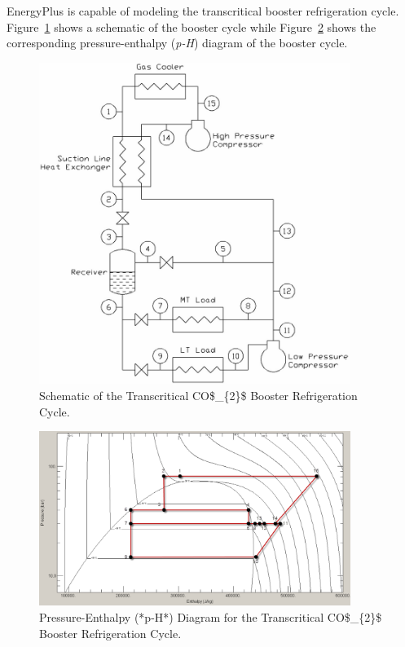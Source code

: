 EnergyPlus is capable of modeling the transcritical booster refrigeration cycle. Figure~\ref{fig:schematic-of-the-transcritical-co_2-booster} shows a schematic of the booster cycle while Figure~\ref{fig:pressure-enthalpy-p-h-diagram-for} shows the corresponding pressure-enthalpy (\emph{p-H}) diagram of the booster cycle.

\begin{figure}[hbtp] %
\centering
\includegraphics[width=0.9\textwidth, height=0.9\textheight, keepaspectratio=true]{media/image6337.png}
\caption{  Schematic of the Transcritical CO\$\_\{2\}\$ Booster Refrigeration Cycle. \protect \label{fig:schematic-of-the-transcritical-co_2-booster}}
\end{figure}

\begin{figure}[hbtp] %
\centering
\includegraphics[width=0.9\textwidth, height=0.9\textheight, keepaspectratio=true]{media/image6338.png}
\caption{  Pressure-Enthalpy (*p-H*) Diagram for the Transcritical CO\$\_\{2\}\$ Booster Refrigeration Cycle. \protect \label{fig:pressure-enthalpy-p-h-diagram-for}}
\end{figure}

